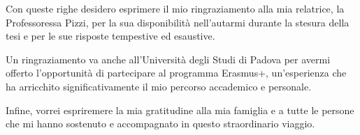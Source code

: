 
Con queste righe desidero esprimere il mio ringraziamento alla mia relatrice, la Professoressa Pizzi, per la sua disponibilità nell'autarmi durante la stesura della tesi e per le sue risposte tempestive ed esaustive.

\vspace{5px}

Un ringraziamento va anche all'Università degli Studi di Padova per avermi offerto l'opportunità di partecipare al programma Erasmus+, un'esperienza che ha arricchito significativamente il mio percorso accademico e personale.

\vspace{5px}

Infine, vorrei espriremere la mia gratitudine alla mia famiglia e a tutte le persone che mi hanno sostenuto e accompagnato in questo straordinario viaggio.

